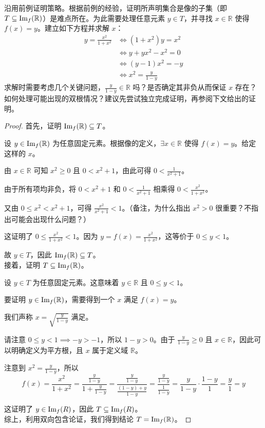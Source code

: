 \begin{example}
    沿用前例证明策略。根据前例的经验，证明所声明集合是像的子集（即 $T \subseteq \text{Im}_f (\mathbb{R})$）是难点所在。为此需要处理任意元素 $y \in T$，并寻找 $x \in \mathbb{R}$ 使得 $f(x) = y$。建立如下方程并求解 $x$：
    \begin{align*}
        y = \frac{x^2}{1+x^2} &\iff  (1 + x^2)y = x^2 \\
        &\iff y + yx^2 - x^2 = 0 \\
        &\iff (y - 1)x^2 = -y \\
        &\iff x^2=\frac{y}{1-y} 
    \end{align*}
    求解时需要考虑几个关键问题，$\frac{y}{1-y} \in \mathbb{R}$ 吗？是否确定其非负从而保证 $x$ 存在？如何处理可能出现的双根情况？建议先尝试独立完成证明，再参阅下文给出的证明。

    \begin{proof}
        首先，证明 $\text{Im}_f (\mathbb{R}) \subseteq T$。

        设 $y \in \text{Im}_f (\mathbb{R})$ 为任意固定元素。根据像的定义，$\exists x \in \mathbb{R}$ 使得 $f(x) = y$。给定这样的 $x$。

        由 $x \in \mathbb{R}$ 可知 $x^2 \ge 0$ 且 $0 < x^2+1$，由此可得 $0 < \frac{1}{x^2+1}$。

        由于所有项均非负，将 $0 < x^2+1$ 和 $0 < \frac{1}{x^2+1}$ 相乘得 $0 < \frac{x^2}{1+x^2}$。

        又由 $0 \le x^2 < x^2 + 1$，可得 $\frac{x^2}{x^2+1}<1$。（备注，为什么指出 $x^2>0$ 很重要？不指出可能会出现什么问题？）

        这证明了 $0 \le \frac{x^2}{1+x^2} < 1$。因为 $y = f(x) = \frac{x^2}{1+x^2}$，这等价于 $0 \le y < 1$。

        故 $y \in T$，因此 $\text{Im}_f (\mathbb{R}) \subseteq T$。\\

        接着，证明 $T \subseteq \text{Im}_f (\mathbb{R})$。

        设 $y \in T$ 为任意固定元素。这意味着 $y \in \mathbb{R}$ 且 $0 \le y < 1$。

        要证明 $y \in \text{Im}_f (\mathbb{R})$，需要得到一个 $x$ 满足 $f(x) = y$。

        我们声称 $x = \sqrt{\frac{y}{1-y}}$ 满足。

        请注意 $0 \le y < 1 \implies -y > -1$，所以 $1-y > 0$。由于 $\frac{y}{1-y} \ge 0$ 且 $x \in \mathbb{R}$，因此可以明确定义为平方根，且 $x$ 属于定义域 $\mathbb{R}$。
        
        注意到 $x^2=\frac{y}{1-y}$，所以
        \[f(x) = \frac{x^2}{1+x^2} = \frac{\frac{y}{1-y}}{1+\frac{y}{1-y}}=\frac{\frac{y}{1-y}}{\frac{(1-y)+y}{1-y}}=\frac{\frac{y}{1-y}}{\frac{1}{1-y}}=\frac{y}{1-y} \cdot \frac{1-y}{1} = \frac{y}{1} = y\]

        这证明了 $y \in \text{Im}_f (R)$，因此 $T \subseteq \text{Im}_f (R)$。\\

        综上，利用双向包含论证，我们得到结论 $T = \text{Im}_f (\mathbb{R})$。
    \end{proof}
\end{example}

